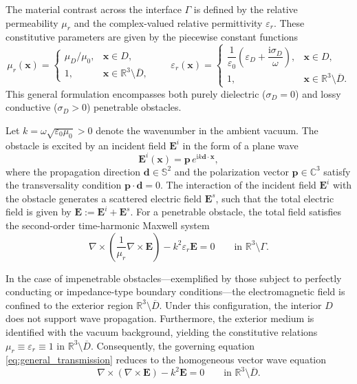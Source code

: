\documentclass[10pt,a4paper]{amsart}
\numberwithin{equation}{section}
\begin{document}
The material contrast across the interface $\Gamma$ is defined by the relative permeability $\mu_r$ and the complex-valued relative permittivity $\varepsilon_r$. These constitutive parameters are given by the piecewise constant functions
\[
    \mu_r(\boldsymbol{x}) =
    \begin{cases}
        \mu_D/\mu_0, & \boldsymbol{x} \in D, \\
        1, & \boldsymbol{x} \in \mathbb{R}^3 \setminus \overline{D},
    \end{cases}
    \qquad
    \varepsilon_r(\boldsymbol{x}) =
    \begin{cases}
        \dfrac{1}{\varepsilon_0}
        \left( \varepsilon_D + \dfrac{\mathrm{i}\sigma_D}{\omega} \right),
        & \boldsymbol{x} \in D, \\
        1, & \boldsymbol{x} \in \mathbb{R}^3 \setminus \overline{D}.
    \end{cases}
\]
This general formulation encompasses both purely dielectric ($\sigma_D = 0$) and lossy conductive ($\sigma_D > 0$) penetrable obstacles. 

Let $k = \omega\sqrt{\varepsilon_0\mu_0} > 0$ denote the wavenumber in the ambient vacuum. The obstacle is excited by an incident field $\mathbf{E}^i$ in the form of a plane wave
\[
\mathbf{E}^i(\boldsymbol{x}) = \boldsymbol{p} \, e^{\mathrm{i}k\boldsymbol{d}\cdot\boldsymbol{x}},
\]
where the propagation direction $\boldsymbol{d} \in \mathbb{S}^2$ and the polarization vector $\boldsymbol{p} \in \mathbb{C}^3$ satisfy the transversality condition $\boldsymbol{p} \cdot \boldsymbol{d} = 0$.
The interaction of the incident field $\mathbf{E}^i$ with the obstacle generates a scattered electric field $\mathbf{E}^s$, such that the total electric field is given by $\mathbf{E} := \mathbf{E}^i + \mathbf{E}^s$. For a penetrable obstacle, the total field satisfies the second-order time-harmonic Maxwell system
\begin{equation}\label{eq:general_transmission}
\nabla \times
\left(
\frac{1}{\mu_r}\nabla \times \mathbf{E}
\right)
-
k^2\varepsilon_r\mathbf{E}
=
0
\qquad
\text{in } \mathbb{R}^3 \setminus \Gamma.
\end{equation}

In the case of impenetrable obstacles---exemplified by those subject to perfectly conducting or impedance-type boundary conditions---the electromagnetic field is confined to the exterior region $\mathbb{R}^3 \setminus \overline{D}$. Under this configuration, the interior $D$ does not support wave propagation. Furthermore, the exterior medium is identified with the vacuum background, yielding the constitutive relations $\mu_r \equiv \varepsilon_r \equiv 1$ in $\mathbb{R}^3 \setminus \overline{D}$. Consequently, the governing equation \eqref{eq:general_transmission} reduces to the homogeneous vector wave equation
\begin{equation}\label{eq:exterior_equation}
\nabla \times (\nabla \times \mathbf{E}) - k^2 \mathbf{E} = 0 \qquad \text{in } \mathbb{R}^3 \setminus \overline{D}.
\end{equation}
\end{document}
